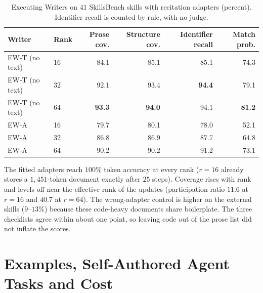 \documentclass[11pt]{article}
\newcommand{\best}[1]{\textbf{#1}}
\newcommand{\EWT}{\textsc{EW-T}}
\newcommand{\EWA}{\textsc{EW-A}}
\begin{document}
\begin{table}[h]
\centering
\caption{Executing Writers on $41$ SkillsBench skills with recitation adapters (percent). Identifier recall is counted by rule, with no judge.}
\label{tab:sb}
\small
\setlength{\tabcolsep}{5pt}
\begin{tabular}{llrrrr}
\toprule
Writer & Rank & Prose cov. & Structure cov. & Identifier recall & Match prob.\\
\midrule
\EWT{} (no text) & 16 & 84.1 & 85.1 & 85.1 & 74.3\\
\EWT{} (no text) & 32 & 92.1 & 93.4 & \best{94.4} & 79.1\\
\EWT{} (no text) & 64 & \best{93.3} & \best{94.0} & 94.1 & \best{81.2}\\
\EWA{} & 16 & 79.7 & 80.1 & 78.0 & 52.1\\
\EWA{} & 32 & 86.8 & 86.9 & 87.7 & 64.8\\
\EWA{} & 64 & 90.2 & 90.2 & 91.2 & 73.1\\
\bottomrule
\end{tabular}
\end{table}

The fitted adapters reach $100\%$ token accuracy at every rank ($r=16$ already stores a $1{,}451$-token document exactly after $25$ steps). Coverage rises
with rank and levels off near the effective rank of the updates (participation ratio $11.6$ at $r=16$ and $40.7$ at $r=64$). The wrong-adapter control
is higher on the external skills ($9$--$13\%$) because these code-heavy documents share boilerplate. The three checklists agree within about one point,
so leaving code out of the prose list did not inflate the scores.

\section{Examples, Self-Authored Agent Tasks and Cost}
\label{app:examples}
\end{document}
